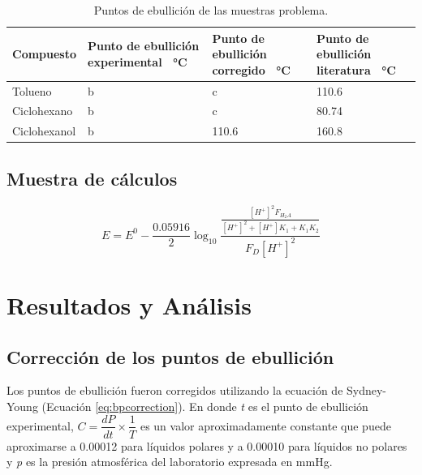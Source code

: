 \documentclass[letterpaper]{article}
\begin{document}
\begin{table}[h!]
	\centering
	\begin{tabu} to 0.9\textwidth {  X[c]  X[c]  X[c] X[c] }
		\hline
		\textbf{Compuesto} & \textbf{Punto de ebullición experimental \SI{}{\degreeCelsius}} & \textbf{Punto de ebullición corregido \SI{}{\degreeCelsius}} & \textbf{Punto de ebullición literatura \SI{}{\degreeCelsius}} \\ \hline
		Tolueno            & b                                         & c                                      & \num{110.6}                                   \\
		Ciclohexano        & b                                         & c                                      & \num{80,74}                                   \\
		Ciclohexanol       & b                                         & \num{110.6}                                  & \num{160,8}                                   \\ \hline
	\end{tabu}
	\caption{Puntos de ebullición de las muestras problema.}
	\label{tab:boiling}
\end{table}

\subsection{Muestra de cálculos}

\begin{equation}
E={ E }^{ 0 }-\frac { 0.05916 }{ 2 } \log _{ 10 }{ \frac { \frac { { \left[ { H }^{ + } \right]  }^{ 2 }{ F }_{ { H }_{ 2 }A } }{ { \left[ { H }^{ + } \right]  }^{ 2 }+{ \left[ { H }^{ + } \right]  }{ K }_{ 1 }+{ K }_{ 1 }{ K }_{ 2 } }  }{ { F }_{ D }{ \left[ { H }^{ + } \right]  }^{ 2 } }  } 
\end{equation}

\section{Resultados y Análisis}

\subsection{Corrección de los puntos de ebullición}

Los puntos de ebullición fueron corregidos utilizando la ecuación de Sydney-Young \cite{young:1902} (Ecuación \ref{eq:bpcorrection}). En donde \textit{t} es el punto de ebullición experimental, $C = \dfrac{dP}{dt} \times \dfrac{1}{T}$ es un valor aproximadamente constante que puede aproximarse a \num{0.00012} para líquidos polares y a \num{0.00010} para líquidos no polares y \textit{p} es la presión atmosférica del laboratorio expresada en mmHg.
\end{document}
